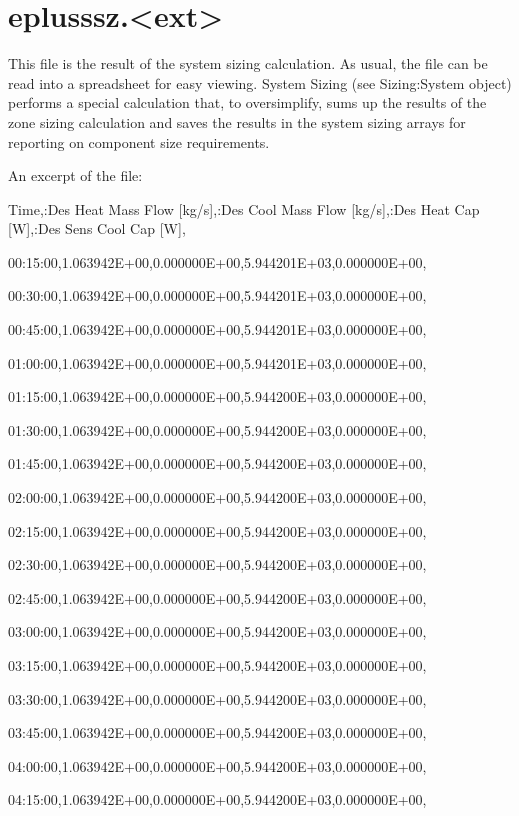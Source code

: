 \section{eplusssz.\textless{}ext\textgreater{}}\label{eplusssz.ext}

This file is the result of the system sizing calculation. As usual, the file can be read into a spreadsheet for easy viewing. System Sizing (see Sizing:System object) performs a special calculation that, to oversimplify, sums up the results of the zone sizing calculation and saves the results in the system sizing arrays for reporting on component size requirements.

An excerpt of the file:

Time,:Des Heat Mass Flow {[}kg/s{]},:Des Cool Mass Flow {[}kg/s{]},:Des Heat Cap {[}W{]},:Des Sens Cool Cap {[}W{]},

00:15:00,1.063942E+00,0.000000E+00,5.944201E+03,0.000000E+00,

00:30:00,1.063942E+00,0.000000E+00,5.944201E+03,0.000000E+00,

00:45:00,1.063942E+00,0.000000E+00,5.944201E+03,0.000000E+00,

01:00:00,1.063942E+00,0.000000E+00,5.944201E+03,0.000000E+00,

01:15:00,1.063942E+00,0.000000E+00,5.944200E+03,0.000000E+00,

01:30:00,1.063942E+00,0.000000E+00,5.944200E+03,0.000000E+00,

01:45:00,1.063942E+00,0.000000E+00,5.944200E+03,0.000000E+00,

02:00:00,1.063942E+00,0.000000E+00,5.944200E+03,0.000000E+00,

02:15:00,1.063942E+00,0.000000E+00,5.944200E+03,0.000000E+00,

02:30:00,1.063942E+00,0.000000E+00,5.944200E+03,0.000000E+00,

02:45:00,1.063942E+00,0.000000E+00,5.944200E+03,0.000000E+00,

03:00:00,1.063942E+00,0.000000E+00,5.944200E+03,0.000000E+00,

03:15:00,1.063942E+00,0.000000E+00,5.944200E+03,0.000000E+00,

03:30:00,1.063942E+00,0.000000E+00,5.944200E+03,0.000000E+00,

03:45:00,1.063942E+00,0.000000E+00,5.944200E+03,0.000000E+00,

04:00:00,1.063942E+00,0.000000E+00,5.944200E+03,0.000000E+00,

04:15:00,1.063942E+00,0.000000E+00,5.944200E+03,0.000000E+00,


